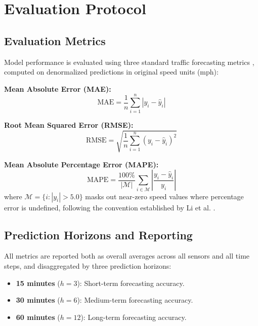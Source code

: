 \section{Evaluation Protocol}
\label{sec:eval_protocol}

\subsection{Evaluation Metrics}

Model performance is evaluated using three standard traffic forecasting metrics \cite{li2018}, computed on denormalized predictions in original speed units (mph):

\textbf{Mean Absolute Error (MAE):}
\begin{equation}
\text{MAE} = \frac{1}{n} \sum_{i=1}^{n} |y_i - \hat{y}_i|
\end{equation}

\textbf{Root Mean Squared Error (RMSE):}
\begin{equation}
\text{RMSE} = \sqrt{\frac{1}{n} \sum_{i=1}^{n} (y_i - \hat{y}_i)^2}
\end{equation}

\textbf{Mean Absolute Percentage Error (MAPE):}
\begin{equation}
\text{MAPE} = \frac{100\%}{|\mathcal{M}|} \sum_{i \in \mathcal{M}} \left|\frac{y_i - \hat{y}_i}{y_i}\right|
\end{equation}
where $\mathcal{M} = \{i : |y_i| > 5.0\}$ masks out near-zero speed values where percentage error is undefined, following the convention established by Li et al. \cite{li2018}.

\subsection{Prediction Horizons and Reporting}

All metrics are reported both as overall averages across all sensors and all time steps, and disaggregated by three prediction horizons:

\begin{itemize}
    \item \textbf{15 minutes} ($h = 3$): Short-term forecasting accuracy.
    \item \textbf{30 minutes} ($h = 6$): Medium-term forecasting accuracy.
    \item \textbf{60 minutes} ($h = 12$): Long-term forecasting accuracy.
\end{itemize}

